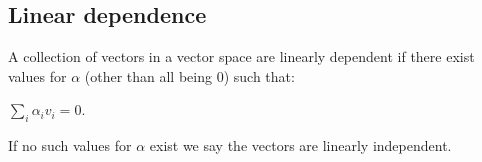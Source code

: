 
\subsection{Linear dependence}

A collection of vectors in a vector space are linearly dependent if there exist values for \(\alpha \) (other than all being \(0\)) such that:

\(\sum_i \alpha_i v_i =0\).

If no such values for \(\alpha \) exist we say the vectors are linearly independent.


